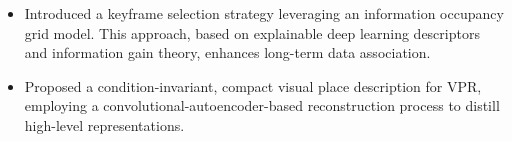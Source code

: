 \documentclass[12pt,a4paper,sans]{moderncv} %
\newcommand\Colorhref[3][orange]{\href{#2}{\small\color{#1}#3}}
\begin{document}
{
  \begin{itemize}
    \item Introduced a keyframe selection strategy leveraging an information occupancy grid model. This approach, based on explainable deep learning descriptors and information gain theory, enhances long-term data association.
    \item Proposed a condition-invariant, compact visual place description for VPR, employing a convolutional-autoencoder-based reconstruction process to distill high-level representations.
  \end{itemize}
}






\end{document}
